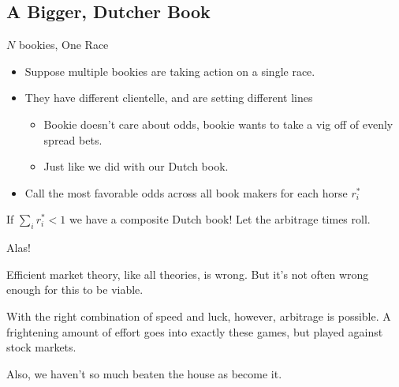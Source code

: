 \documentclass[pdf]{beamer}
\begin{document}
\subsection{A Bigger, Dutcher Book}
\begin{frame}{$N$ bookies, One Race}
  \begin{itemize}
  \item Suppose multiple bookies are taking action on a single race.
  \item They have different clientelle, and are setting different lines
    \begin{itemize}
    \item Bookie doesn't care about odds, bookie wants to take a vig off of evenly spread bets.
    \item Just like we did with our Dutch book.
    \end{itemize}
  \item Call the most favorable odds across all book makers for each horse $r^*_i$
  \end{itemize}

  If $ \sum_i r_i^* < 1 $ we have a composite Dutch book! Let the arbitrage
times roll.
\end{frame}

\begin{frame}{Alas!}

Efficient market theory, like all theories, is wrong. But it's not often
wrong enough for this to be viable.

\pause

With the right combination of speed and luck, however, arbitrage is possible. A
frightening amount of effort goes into exactly these games, but played against
stock markets.

\pause

Also, we haven't so much beaten the house as become it.

\end{frame}
\end{document}
